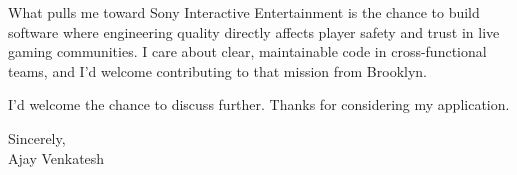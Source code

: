 \documentclass[letterpaper,11pt]{article}
\begin{document}
What pulls me toward Sony Interactive Entertainment is the chance to build software where engineering quality directly affects player safety and trust in live gaming communities. I care about clear, maintainable code in cross-functional teams, and I'd welcome contributing to that mission from Brooklyn.

I'd welcome the chance to discuss further. Thanks for considering my application.

\vspace{12pt}
Sincerely, \\
Ajay Venkatesh
\end{document}
